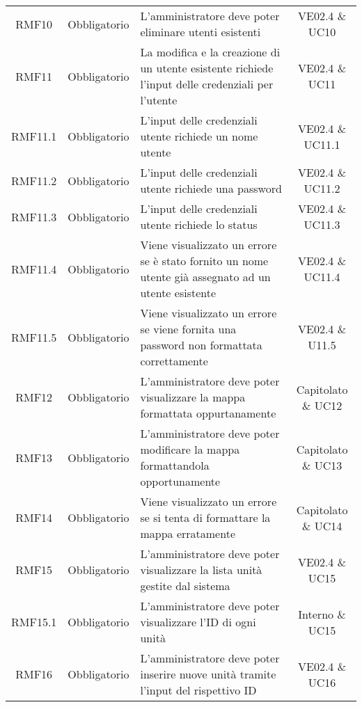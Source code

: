 \begin{longtable}[h!] { c c m{8cm} c}
		
		RMF10 & Obbligatorio & L'amministratore deve poter eliminare utenti esistenti & VE02.4 \& UC10 \\
		
		RMF11 & Obbligatorio & La modifica e la creazione di un utente esistente richiede l'input delle credenziali per l'utente & VE02.4 \& UC11 \\
		
		RMF11.1 & Obbligatorio & L'input delle credenziali utente richiede un nome utente & VE02.4 \& UC11.1 \\
		
		RMF11.2 & Obbligatorio & L'input delle credenziali utente richiede una password & VE02.4 \& UC11.2 \\
		
		RMF11.3 & Obbligatorio & L'input delle credenziali utente richiede lo status & VE02.4 \& UC11.3 \\
		
		RMF11.4 & Obbligatorio & Viene visualizzato un errore se è stato fornito un nome utente già assegnato ad un utente esistente & VE02.4 \& UC11.4 \\
		
		RMF11.5 & Obbligatorio & Viene visualizzato un errore se viene fornita una password non formattata correttamente & VE02.4 \& U11.5 \\
		
		RMF12 & Obbligatorio & L'amministratore deve poter visualizzare la mappa formattata oppurtanamente & Capitolato \& UC12 \\
		
		RMF13 & Obbligatorio & L'amministratore deve poter modificare la mappa formattandola opportunamente & Capitolato \& UC13 \\
		
		RMF14 & Obbligatorio & Viene visualizzato un errore se si tenta di formattare la mappa erratamente & Capitolato \& UC14 \\
		
		RMF15 & Obbligatorio & L'amministratore deve poter visualizzare la lista unità gestite dal sistema & VE02.4 \& UC15 \\
		
		RMF15.1 & Obbligatorio & L'amministratore deve poter visualizzare l'ID di ogni unità & Interno \& UC15 \\
		
		RMF16 & Obbligatorio & L'amministratore deve poter inserire nuove unità tramite l'input del rispettivo ID & VE02.4 \& UC16 \\
		

\end{longtable}

